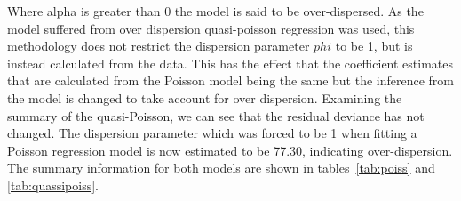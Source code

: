 Where alpha is greater than 0 the model is said to be over-dispersed. As the  model suffered from over dispersion  quasi-poisson regression was used, this methodology does not restrict the dispersion parameter $phi$ to be 1, but is instead  calculated from the data. This has the effect that the coefficient estimates that are calculated from the Poisson model being the same  but the inference from the model is  changed to take account for over dispersion. Examining the summary of the quasi-Poisson, we can see that the residual deviance has not changed. The dispersion parameter which was forced to be 1 when fitting a Poisson regression model is now estimated to be 77.30, indicating over-dispersion. The summary information for both models are shown in tables~\ref{tab:poiss} and \ref{tab:quassipoiss}. 


